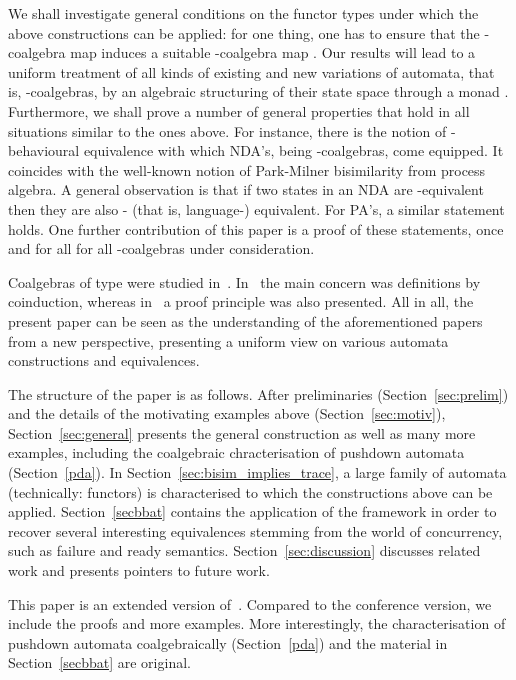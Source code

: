 \documentclass{LMCS}
\begin{document}
We shall investigate general conditions on the functor types under
which the above constructions can be applied: for one thing, one has
to ensure that the  -coalgebra map  induces a suitable
-coalgebra map . 
Our results will lead to a uniform
treatment of all kinds of existing and new variations of automata,
that is, -coalgebras, by an algebraic structuring of their state
space through a monad . Furthermore, we shall prove a number of
general properties that hold in all situations similar to the ones
above. For instance, there is the notion of -behavioural
equivalence with which NDA's, being -coalgebras, come equipped.
It coincides with the well-known notion of Park-Milner bisimilarity
from process algebra. A general observation is that if two states in
an NDA are -equivalent then they are also - (that is,
language-) equivalent. For PA's, a similar statement holds. One
further contribution of this paper is a proof of these statements,
once and for all for all -coalgebras under consideration.

Coalgebras of type  were studied in~\cite{Lenisa99,bartels,jacobs05}. In~\cite{bartels,jacobs05}
the main concern was definitions by coinduction, whereas in~\cite{Lenisa99} a proof principle was also presented.
 All in all, the present paper can be seen as the understanding of the aforementioned papers from a new perspective, presenting a uniform view on various automata constructions and equivalences.

The structure of the paper is as follows. After preliminaries
(Section~\ref{sec:prelim}) and
the details of the motivating examples above (Section~\ref{sec:motiv}),
Section~\ref{sec:general} presents the general construction
 as well as many more examples, including the coalgebraic chracterisation of pushdown automata (Section~\ref{pda}).
In Section~\ref{sec:bisim_implies_trace}, a large family of automata
(technically: functors) is characterised to which the constructions
above can be applied. Section~\ref{secbbat} contains the application of the framework in order to recover several 
interesting equivalences stemming from the world of concurrency, such as failure and ready semantics. 
Section~\ref{sec:discussion} discusses related work and presents pointers to future work.

This paper is an extended version of~\cite{FSTTCS}. Compared to the conference version, we include the proofs and more examples. More interestingly, the characterisation of pushdown automata coalgebraically (Section~\ref{pda}) and the
material in Section~\ref{secbbat} are original.
\end{document}
